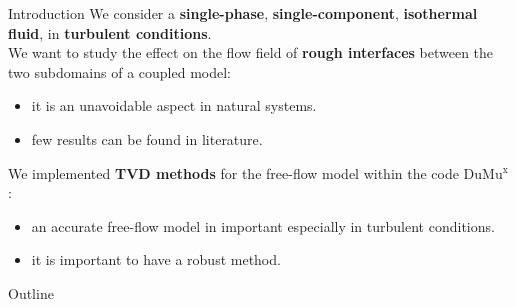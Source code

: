 \documentclass{beamer}
\newcommand{\DUMUX}{DuMu$^\mathrm{x}$\xspace} %
\begin{document}
%
\begin{frame}{Introduction}
We consider a \textbf{single-phase}, \textbf{single-component}, 
\textbf{isothermal fluid}, in \textbf{turbulent conditions}.\\
\vspace{0.3cm}
We want to study the effect on the flow field of \textbf{rough interfaces} 
between the two 
subdomains of a coupled model:
\begin{itemize}
	\item it is an unavoidable aspect in natural systems.
	\item few results can be found in literature.
\end{itemize}
\vspace{0.3cm}
We implemented \textbf{TVD methods} for the free-flow model within the 
code \DUMUX:
\begin{itemize}
	\item an accurate free-flow model in important especially in turbulent 
	conditions.
	\item it is important to have a robust method.
\end{itemize}
\end{frame}
\begin{frame}{Outline}
	\tableofcontents
\end{frame}
\end{document}
